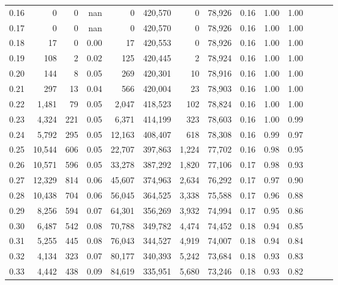 \begin{tabular}{rrrrrrrrrrrrrr}
0.16 &       0 &      0 &   nan &        0 &  420,570 &       0 &  78,926 &  0.16 &  1.00 &      1.00 \\
0.17 &       0 &      0 &   nan &        0 &  420,570 &       0 &  78,926 &  0.16 &  1.00 &      1.00 \\
0.18 &      17 &      0 &  0.00 &       17 &  420,553 &       0 &  78,926 &  0.16 &  1.00 &      1.00 \\
0.19 &     108 &      2 &  0.02 &      125 &  420,445 &       2 &  78,924 &  0.16 &  1.00 &      1.00 \\
0.20 &     144 &      8 &  0.05 &      269 &  420,301 &      10 &  78,916 &  0.16 &  1.00 &      1.00 \\
0.21 &     297 &     13 &  0.04 &      566 &  420,004 &      23 &  78,903 &  0.16 &  1.00 &      1.00 \\
0.22 &   1,481 &     79 &  0.05 &    2,047 &  418,523 &     102 &  78,824 &  0.16 &  1.00 &      1.00 \\
0.23 &   4,324 &    221 &  0.05 &    6,371 &  414,199 &     323 &  78,603 &  0.16 &  1.00 &      0.99 \\
0.24 &   5,792 &    295 &  0.05 &   12,163 &  408,407 &     618 &  78,308 &  0.16 &  0.99 &      0.97 \\
0.25 &  10,544 &    606 &  0.05 &   22,707 &  397,863 &   1,224 &  77,702 &  0.16 &  0.98 &      0.95 \\
0.26 &  10,571 &    596 &  0.05 &   33,278 &  387,292 &   1,820 &  77,106 &  0.17 &  0.98 &      0.93 \\
0.27 &  12,329 &    814 &  0.06 &   45,607 &  374,963 &   2,634 &  76,292 &  0.17 &  0.97 &      0.90 \\
0.28 &  10,438 &    704 &  0.06 &   56,045 &  364,525 &   3,338 &  75,588 &  0.17 &  0.96 &      0.88 \\
0.29 &   8,256 &    594 &  0.07 &   64,301 &  356,269 &   3,932 &  74,994 &  0.17 &  0.95 &      0.86 \\
0.30 &   6,487 &    542 &  0.08 &   70,788 &  349,782 &   4,474 &  74,452 &  0.18 &  0.94 &      0.85 \\
0.31 &   5,255 &    445 &  0.08 &   76,043 &  344,527 &   4,919 &  74,007 &  0.18 &  0.94 &      0.84 \\
0.32 &   4,134 &    323 &  0.07 &   80,177 &  340,393 &   5,242 &  73,684 &  0.18 &  0.93 &      0.83 \\
0.33 &   4,442 &    438 &  0.09 &   84,619 &  335,951 &   5,680 &  73,246 &  0.18 &  0.93 &      0.82 \\

\end{tabular}
